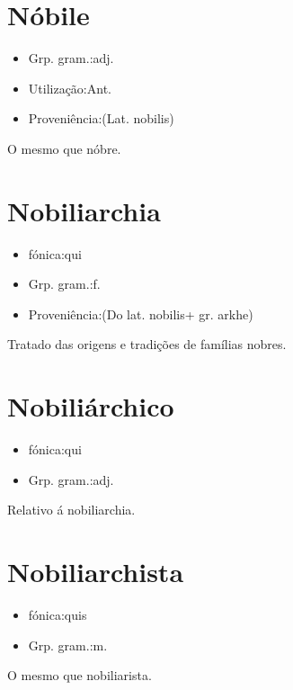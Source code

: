 \section{Nóbile}
\begin{itemize}
\item {Grp. gram.:adj.}
\end{itemize}
\begin{itemize}
\item {Utilização:Ant.}
\end{itemize}
\begin{itemize}
\item {Proveniência:(Lat. \textunderscore nobilis\textunderscore )}
\end{itemize}
O mesmo que \textunderscore nóbre\textunderscore .
\section{Nobiliarchia}
\begin{itemize}
\item {fónica:qui}
\end{itemize}
\begin{itemize}
\item {Grp. gram.:f.}
\end{itemize}
\begin{itemize}
\item {Proveniência:(Do lat. \textunderscore nobilis\textunderscore  + gr. \textunderscore arkhe\textunderscore )}
\end{itemize}
Tratado das origens e tradições de famílias nobres.
\section{Nobiliárchico}
\begin{itemize}
\item {fónica:qui}
\end{itemize}
\begin{itemize}
\item {Grp. gram.:adj.}
\end{itemize}
Relativo á nobiliarchia.
\section{Nobiliarchista}
\begin{itemize}
\item {fónica:quis}
\end{itemize}
\begin{itemize}
\item {Grp. gram.:m.}
\end{itemize}
O mesmo que \textunderscore nobiliarista\textunderscore .
